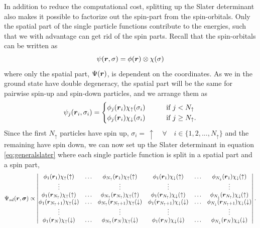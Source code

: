 In addition to reduce the computational cost, splitting up the Slater determinant also makes it possible to factorize out the spin-part from the spin-orbitals. Only the spatial part of the single particle functions contribute to the energies, such that we with advantage can get rid of the spin parts. Recall that the spin-orbitals can be written as 
\begin{equation}
\psi(\boldsymbol{{r}},\sigma)=\phi(\boldsymbol{{r}})\otimes\chi(\sigma) 
\end{equation}
where only the spatial part, $\Psi(\boldsymbol{{r}})$, is dependent on the coordinates. As we in the ground state have double degeneracy, the spatial part will be the same for pairwise spin-up and spin-down particles, and we arrange them as
\begin{equation}
\psi_j(\boldsymbol{{r}}_i,\sigma_i)=
\begin{cases}
\phi_j(\boldsymbol{{r}}_i)\chi_{\uparrow}(\sigma_i)\quad\quad&\text{if } j<N_{\uparrow}\\
\phi_j(\boldsymbol{{r}}_i)\chi_{\downarrow}(\sigma_i)\quad\quad&\text{if } j\geq N_{\uparrow}.
\end{cases}
\end{equation}
Since the first $N_{\uparrow}$ particles have spin up, $\sigma_i=\,\uparrow\quad\forall\quad i\in\{1,2,...,N_{\uparrow}\}$ and the remaining have spin down, we can now set up the Slater determinant in equation \eqref{eq:generalslater} where each single particle function is split in a spatial part and a spin part,
\begin{equation*}
\Psi_{sd}(\boldsymbol{r},\boldsymbol{{\sigma}})\propto
\begin{vmatrix}
\phi_1(\boldsymbol{r}_1)\chi_{\uparrow}(\uparrow) & \hdots & \phi_{N_{\uparrow}}(\boldsymbol{r}_1)\chi_{\uparrow}(\uparrow) & \phi_{1}(\boldsymbol{r}_1)\chi_{\downarrow}(\uparrow) & \hdots & \phi_{N_{\downarrow}}(\boldsymbol{r}_1)\chi_{\downarrow}(\uparrow)\\
\vdots & & \vdots & \vdots & & \vdots \\
\phi_1(\boldsymbol{r}_{N_{\uparrow}})\chi_{\uparrow}(\uparrow) & \hdots & \phi_{N_{\uparrow}}(\boldsymbol{r}_{N_{\uparrow}})\chi_{\uparrow}(\uparrow) & \phi_{1}(\boldsymbol{r}_{N_{\uparrow}})\chi_{\downarrow}(\uparrow) & \hdots & \phi_{N_{\downarrow}}(\boldsymbol{r}_{N_{\uparrow}})\chi_{\downarrow}(\uparrow)\\
\phi_1(\boldsymbol{r}_{N_{\uparrow}+1})\chi_{\uparrow}(\downarrow) & \hdots & \phi_{N_{\uparrow}}(\boldsymbol{r}_{N_{\uparrow}+1})\chi_{\uparrow}(\downarrow) & \phi_{1}(\boldsymbol{r}_{N_{\uparrow}+1})\chi_{\downarrow}(\downarrow) & \hdots & \phi_{N_{\downarrow}}(\boldsymbol{r}_{N_{\uparrow}+1})\chi_{\downarrow}(\downarrow)\\
\vdots & & \vdots & \vdots & & \vdots \\
\phi_1(\boldsymbol{r}_N)\chi_{\uparrow}(\downarrow) & \hdots & \phi_{N_{\uparrow}}(\boldsymbol{r}_N)\chi_{\uparrow}(\downarrow) & \phi_{1}(\boldsymbol{r}_N)\chi_{\downarrow}(\downarrow) & \hdots & \phi_{N_{\downarrow}}(\boldsymbol{r}_N)\chi_{\downarrow}(\downarrow)\\
\end{vmatrix}.
\end{equation*}
